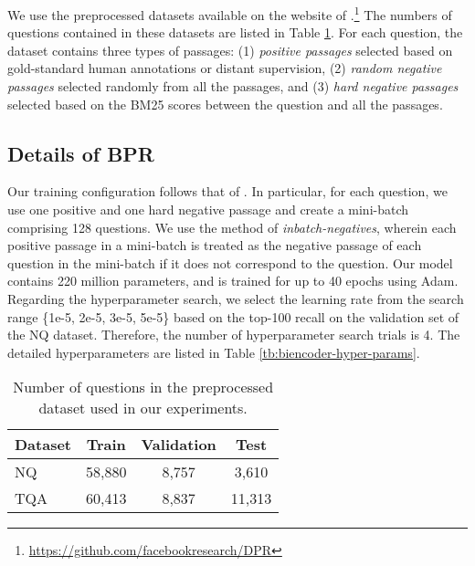 \documentclass[11pt,a4paper]{article}
\begin{document}
We use the preprocessed datasets available on the website of \citet{Karpukhin2020DenseAnswering}.\footnote{\url{https://github.com/facebookresearch/DPR}}
The numbers of questions contained in these datasets are listed in Table \ref{tb:dataset-details}.
For each question, the dataset contains three types of passages: (1) \textit{positive passages} selected based on gold-standard human annotations or distant supervision, (2) \textit{random negative passages} selected randomly from all the passages, and (3) \textit{hard negative passages} selected based on the BM25 scores between the question and all the passages.

\subsection{Details of BPR}
\label{details-training}
Our training configuration follows that of \citet{Karpukhin2020DenseAnswering}.
In particular, for each question, we use one positive and one hard negative passage and create a mini-batch comprising 128 questions.
We use the method of \textit{inbatch-negatives}, wherein each positive passage in a mini-batch is treated as the negative passage of each question in the mini-batch if it does not correspond to the question.
Our model contains 220 million parameters, and is trained for up to 40 epochs using Adam.
Regarding the hyperparameter search, we select the learning rate from the search range \{1e-5, 2e-5, 3e-5, 5e-5\} based on the top-100 recall on the validation set of the NQ dataset.
Therefore, the number of hyperparameter search trials is 4.
The detailed hyperparameters are listed in Table \ref{tb:biencoder-hyper-params}.

\begin{table}[t]
  \centering
  \small{
    \begin{tabular}{l|ccc}
      \toprule
      \textbf{Dataset}  & \textbf{Train} & \textbf{Validation} & \textbf{Test} \\
      \midrule
      NQ & 58,880         & 8,757                & 3,610         \\
      TQA          & 60,413         & 8,837                & 11,313        \\
      \bottomrule
    \end{tabular}
  }
    \caption{Number of questions in the preprocessed dataset used in our experiments.}
  \label{tb:dataset-details}
\end{table}
\end{document}
